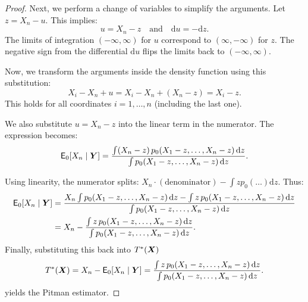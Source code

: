 \begin{proof}
Next, we perform a change of variables to simplify the arguments. Let \(z = X_n - u\). This implies:
\[
u = X_n - z \quad \text{and} \quad \mathrm{d}u = -\mathrm{d}z.
\]
The limits of integration \((-\infty, \infty)\) for \(u\) correspond to \((\infty, -\infty)\) for \(z\). The negative sign from the differential \(\mathrm{d}u\) flips the limits back to \((-\infty, \infty)\).

Now, we transform the arguments inside the density function using this substitution:
\[
X_i - X_n + u = X_i - X_n + (X_n - z) = X_i - z.
\]
This holds for all coordinates \(i=1, \dots, n\) (including the last one).

We also substitute \(u = X_n - z\) into the linear term in the numerator. The expression becomes:
\[
\mathsf{E}_0[X_n \mid \boldsymbol{Y}] = \frac{\int (X_n - z) \, p_0(X_1 - z, \dots, X_n - z) \, \mathrm{d}z}{\int p_0(X_1 - z, \dots, X_n - z) \, \mathrm{d}z}.
\]

Using linearity, the numerator splits: \(X_n \cdot (\text{denominator}) - \int z p_0(\dots) \mathrm{d}z\).
Thus:
\[
\begin{split}
\mathsf{E}_0[X_n \mid \boldsymbol{Y}] &= \frac{X_n \int p_0(X_1 - z, \dots, X_n - z) \, \mathrm{d}z - \int z \, p_0(X_1 - z, \dots, X_n - z) \, \mathrm{d}z}{\int p_0(X_1 - z, \dots, X_n - z) \, \mathrm{d}z} \\
&= X_n - \frac{\int z \, p_0(X_1 - z, \dots, X_n - z) \, \mathrm{d}z}{\int p_0(X_1 - z, \dots, X_n - z) \, \mathrm{d}z}.
\end{split}
\]
Finally, substituting this back into \(T^{*}(\boldsymbol{X})\)
\[
T^*(\boldsymbol{X}) = X_n - \mathsf{E}_0[X_n \mid \boldsymbol{Y}] = \frac{\int z \, p_0(X_1 - z, \dots, X_n - z) \, \mathrm{d}z}{\int p_0(X_1 - z, \dots, X_n - z) \, \mathrm{d}z}.
\]
yields the Pitman estimator.
\end{proof}

